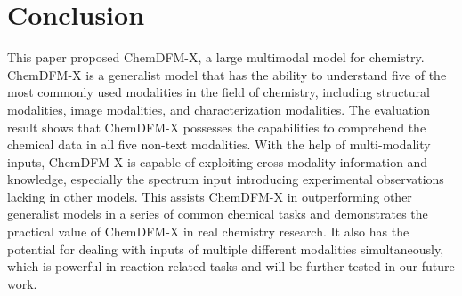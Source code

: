\section{Conclusion}

This paper proposed ChemDFM-X, a large multimodal model for chemistry. ChemDFM-X is a generalist model that has the ability to understand five of the most commonly used modalities in the field of chemistry, including structural modalities, image modalities, and characterization modalities.
The evaluation result shows that ChemDFM-X possesses the capabilities to comprehend the chemical data in all five non-text modalities. With the help of multi-modality inputs, ChemDFM-X is capable of exploiting cross-modality information and knowledge, especially the spectrum input introducing experimental observations lacking in other models. This assists ChemDFM-X in outperforming other generalist models in a series of common chemical tasks and demonstrates the practical value of ChemDFM-X in real chemistry research. It also has the potential for dealing with inputs of multiple different modalities simultaneously, which is powerful in reaction-related tasks and will be further tested in our future work.


